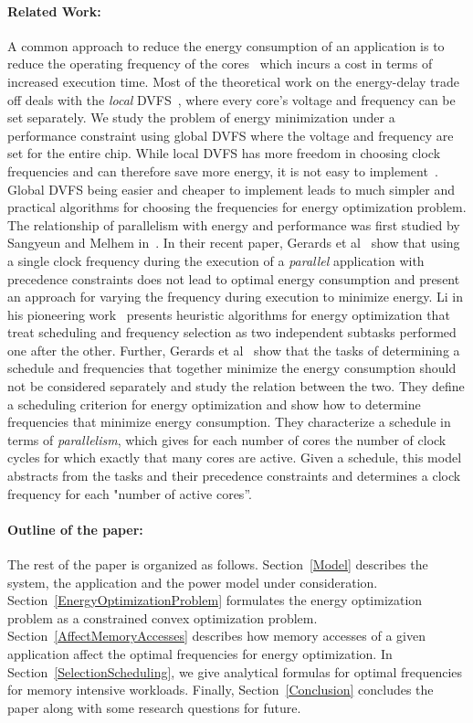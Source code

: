 \documentclass[11pt, letterpaper]{article}
\begin{document}
\paragraph{Related Work:}
A common approach to reduce the energy consumption of an application is to reduce the operating frequency of the cores~\cite{DVFS, DVFS2, DVFS3} which incurs a cost in terms of increased execution time. Most of the theoretical work on the energy-delay trade off deals with the \emph{local} DVFS~\cite{Local1, Local2, Local3}, where every core's voltage and frequency can be set separately. We study the problem of energy minimization under a performance constraint using global DVFS where the voltage and frequency are set for the entire chip. While local DVFS has more freedom in choosing clock frequencies and can therefore save more energy, it is not easy to implement~\cite{GlobalEasy}. Global DVFS being easier and cheaper to implement leads to much simpler and practical algorithms for choosing the frequencies for energy optimization problem. The relationship of parallelism with energy and performance was first studied by Sangyeun and Melhem in~\cite{ParallelizationEnergy}.  In their recent paper, Gerards et al~\cite{ConvexAndScheduling} show that using a single clock frequency during the execution of a \emph{parallel} application with precedence constraints does not lead to optimal energy consumption and present an approach for varying the frequency during execution to minimize energy. Li in his pioneering work~\cite{LiSchedulingAndEnergy} presents heuristic algorithms for energy optimization that treat scheduling and frequency selection as two independent subtasks performed one after the other. Further, Gerards et al~\cite{ConvexAndScheduling} show that the tasks of determining a schedule and frequencies that together minimize the energy consumption should not be considered separately and study the relation between the two. They define a scheduling criterion for energy optimization and show how to determine frequencies that minimize energy consumption. They characterize a schedule in terms of \emph{parallelism}, which gives for each number of cores the number of clock cycles 
for which exactly that many cores are active. Given a schedule, this model abstracts from the tasks and their precedence constraints and determines a clock frequency for each "number of active cores''.






\paragraph{Outline of the paper:}
The rest of the paper is organized as follows. Section~\ref{Model} describes the system, the application and the power model under consideration. Section~\ref{EnergyOptimizationProblem} formulates the energy optimization problem as a constrained convex optimization problem. Section~\ref{AffectMemoryAccesses} describes how memory accesses of a given application affect the optimal frequencies for energy optimization. In Section~\ref{SelectionScheduling}, we give analytical formulas for optimal frequencies for memory intensive workloads. Finally, Section~\ref{Conclusion} concludes the paper along with some research questions for future.
\end{document}
